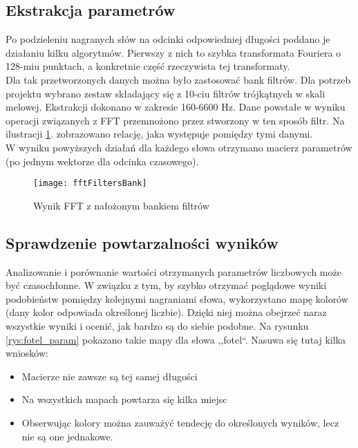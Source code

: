 \subsection{Ekstrakcja parametrów}

Po podzieleniu nagranych słów na odcinki odpowiedniej długości poddano je działaniu kilku algorytmów. Pierwszy z nich to szybka transformata Fouriera o 128-miu punktach, a konkretnie część rzeczywista tej transformaty. \\
Dla tak przetworzonych danych można było zastosować bank filtrów. Dla potrzeb projektu wybrano zestaw składający się z 10-ciu filtrów trójkątnych w skali melowej. Ekstrakcji dokonano w zakresie 160-6600 Hz. Dane powstałe w wyniku operacji związanych z FFT przemnożono przez stworzony w ten sposób filtr. Na ilustracji \ref{rys:fftFiltry}. zobrazowano relację, jaka występuje pomiędzy tymi danymi. \\
W wyniku powyższych działań dla każdego słowa otrzymano macierz parametrów (po jednym wektorze dla odcinka czasowego).

\begin{figure}[H]
	\centering
	\texttt{[image: fftFiltersBank]}
	\caption{Wynik FFT z nałożonym bankiem filtrów}
	\label{rys:fftFiltry}
\end{figure}


\subsection{Sprawdzenie powtarzalności wyników}

Analizowanie i porównanie wartości otrzymanych parametrów liczbowych może być czasochłonne. W związku z tym, by szybko otrzymać poglądowe wyniki podobieństw pomiędzy kolejnymi nagraniami słowa, wykorzystano mapę kolorów (dany kolor odpowiada określonej liczbie). Dzięki niej można obejrzeć naraz wszystkie wyniki i ocenić, jak bardzo są do siebie podobne. Na rysunku \ref{rys:fotel_param} pokazano takie mapy dla słowa ,,fotel``. Nasuwa się tutaj kilka wniosków:

\begin{itemize}
	\item Macierze nie zawsze są tej samej długości
	\item Na wszystkich mapach powtarza się kilka miejsc
	\item Obserwując kolory można zauważyć tendecję do określonych wyników, lecz nie są one jednakowe.
\end{itemize}

